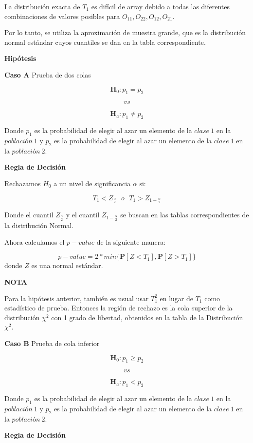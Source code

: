 \documentclass[
  a4paper,
  oneside,
  openany]{book}
\begin{document}
La distribución exacta de \(T_1\) es difícil de array debido a todas las diferentes combinaciones de valores posibles para \(O_{11},O_{22},O_{12},O_{21}\).

Por lo tanto, se utiliza la aproximación de muestra grande, que es la distribución normal estándar cuyos cuantiles se dan en la tabla correspondiente.

\textbf{Hipótesis}

\textbf{Caso A} Prueba de dos colas

\[\textbf{H}_0: p_{1} = p_{2}\]

\[vs\]

\[\textbf{H}_a: p_{1} \neq p_{2}\]

Donde \(p_{1}\) es la probabilidad de elegir al azar un elemento de la \(clase\ 1\) en la \(población\ 1\) y \(p_{2}\) es la probabilidad de elegir al azar un elemento de la \(clase\ 1\) en la \(población\ 2\).

\textbf{Regla de Decisión}

Rechazamos \(H_0\) a un nivel de significancia \(\alpha\) si:

\[T_{1}< Z_\frac{\alpha}{2} \ \ \    o  \ \ \  T_{1} > Z_{1-\frac{\alpha}{2}}\]

Donde el cuantil \(Z_\frac{\alpha}{2}\) y el cuantil \(Z_{1-\frac{\alpha}{2}}\) se buscan en las tablas correspondientes de la distribución Normal.

Ahora calculamos el \(p-value\) de la siguiente manera:

\[p-value=2*min\{ \mathbf{P}[Z<T_{1}],\mathbf{P}[Z>T_{1}]\}\]
donde \(Z\) es una normal estándar.

\textbf{NOTA}

Para la hipótesis anterior, también es usual usar \(T_{1}^2\) en lugar de \(T_{1}\) como estadístico de prueba. Entonces la región de rechazo es la cola superior de la distribución \(\chi^2\) con 1 grado de libertad, obtenidos en la tabla de la Distribución \(\chi^2\).

\textbf{Caso B} Prueba de cola inferior

\[\textbf{H}_0: p_{1} \geq p_{2}\]

\[vs\]

\[\textbf{H}_a: p_{1} < p_{2}\]

Donde \(p_{1}\) es la probabilidad de elegir al azar un elemento de la \(clase\ 1\) en la \(población\ 1\) y \(p_{2}\) es la probabilidad de elegir al azar un elemento de la \(clase\ 1\) en la \(población\ 2\).

\textbf{Regla de Decisión}
\end{document}

